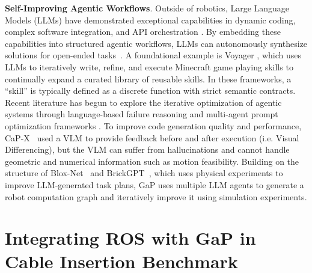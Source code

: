 \textbf{Self-Improving Agentic Workflows}.
Outside of robotics, Large Language Models (LLMs) have demonstrated exceptional capabilities in dynamic coding, complex software integration, and API orchestration \cite{wu2024introducing, team2026qwen3, hou2025model, openai2024gpt4o, anthropic2024claude35, google2025gemini25}. By embedding these capabilities into structured agentic workflows, LLMs can autonomously synthesize solutions for open-ended tasks~\cite{zhang2025aflow}. A foundational example is Voyager \cite{wang2023voyager}, which uses LLMs to iteratively write, refine, and execute Minecraft game playing skills to continually expand a curated library of reusable skills. In these frameworks, a ``skill'' is typically defined as a discrete function with strict semantic contracts. Recent literature has begun to explore the iterative optimization of agentic systems through language-based failure reasoning \cite{zehle2026promptolution} and multi-agent prompt optimization frameworks \cite{agrawal2025gepa, lee2025feedback}.
To improve code generation quality and performance, CaP-X~\cite{fu2026cap} used a VLM to provide feedback before and after execution (i.e. Visual Differencing), but the VLM can suffer from hallucinations and cannot handle geometric and numerical information such as motion feasibility. 
Building on the structure of Blox-Net~\cite{goldberg2025bloxnet} and BrickGPT~\cite{pun2025brickgpt}, which uses physical experiments to improve LLM-generated task plans, GaP uses multiple LLM agents to generate a robot computation graph and iteratively improve it using simulation experiments.



% 




\section{Integrating ROS with GaP in Cable Insertion Benchmark}

